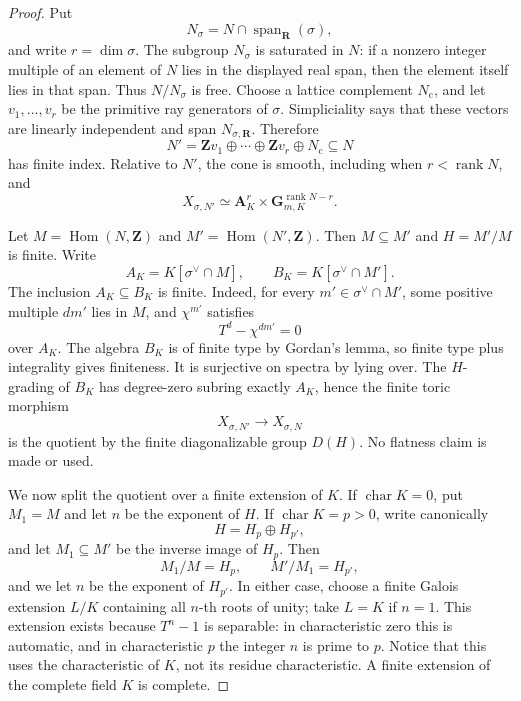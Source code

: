 \begin{proof}
Put
\[
              N_\sigma=N\cap\operatorname{span}_{\mathbf R}(\sigma),
\]
and write \(r=\dim\sigma\).  The subgroup \(N_\sigma\) is saturated in
\(N\): if a nonzero integer multiple of an element of \(N\) lies in the
displayed real span, then the element itself lies in that span.  Thus
\(N/N_\sigma\) is free.  Choose a lattice complement \(N_{\mathrm c}\),
and let \(v_1,\ldots,v_r\) be the primitive ray generators of
\(\sigma\).  Simpliciality says that these vectors are linearly independent
and span \(N_{\sigma,\mathbf R}\).  Therefore
\[
        N'=\mathbf Z v_1\oplus\cdots\oplus\mathbf Z v_r
                      \oplus N_{\mathrm c}\subseteq N
\]
has finite index.  Relative to \(N'\), the cone is smooth, including when
\(r<\operatorname{rank}N\), and
\begin{equation}
 \label{eq:p061-simplicial-smooth-cover}
       X_{\sigma,N'}\simeq
       \mathbf A^r_K\times\mathbf G_{m,K}^{\operatorname{rank}N-r}.
\end{equation}

Let \(M=\operatorname{Hom}(N,\mathbf Z)\) and
\(M'=\operatorname{Hom}(N',\mathbf Z)\).  Then \(M\subseteq M'\) and
\(H=M'/M\) is finite.  Write
\[
 A_K=K[\sigma^\vee\cap M],
 \qquad B_K=K[\sigma^\vee\cap M'].
\]
The inclusion \(A_K\subseteq B_K\) is finite.  Indeed, for every
\(m'\in\sigma^\vee\cap M'\), some positive multiple \(d m'\) lies in
\(M\), and \(\chi^{m'}\) satisfies
\[
                         T^d-\chi^{d m'}=0
\]
over \(A_K\).  The algebra \(B_K\) is of finite type by Gordan's lemma, so
finite type plus integrality gives finiteness.  It is surjective on spectra
by lying over.  The \(H\)-grading of \(B_K\) has degree-zero subring exactly
\(A_K\), hence the finite toric morphism
\begin{equation}
 \label{eq:p061-simplicial-full-cover}
             X_{\sigma,N'}\longrightarrow X_{\sigma,N}
\end{equation}
is the quotient by the finite diagonalizable group \(D(H)\).  No flatness
claim is made or used.

We now split the quotient over a finite extension of \(K\).  If
\(\operatorname{char}K=0\), put \(M_1=M\) and let \(n\) be the exponent
of \(H\).  If \(\operatorname{char}K=p>0\), write canonically
\[
                              H=H_p\oplus H_{p'},
\]
and let \(M_1\subseteq M'\) be the inverse image of \(H_p\).  Then
\[
                       M_1/M=H_p,
             \qquad M'/M_1=H_{p'},
\]
and we let \(n\) be the exponent of \(H_{p'}\).  In either case, choose a
finite Galois extension \(L/K\) containing all \(n\)-th roots of unity;
take \(L=K\) if \(n=1\).  This extension exists because \(T^n-1\) is
separable: in characteristic zero this is automatic, and in characteristic
\(p\) the integer \(n\) is prime to \(p\).  Notice that this uses the
characteristic of \(K\), not its residue characteristic.  A finite extension
of the complete field \(K\) is complete.


\end{proof}
